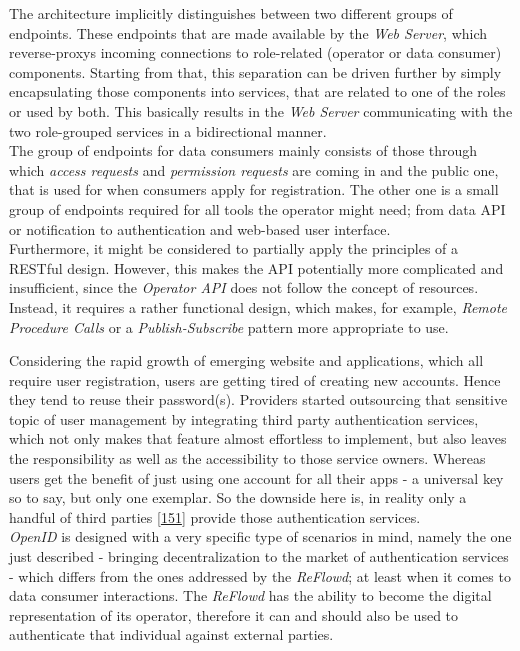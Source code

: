 \documentclass[12pt,english,a4paper,titlepage,cleardoublepage=empty,dottedtoc]{report}
\begin{document}
The architecture implicitly distinguishes between two different groups
of endpoints. These endpoints that are made available by the \emph{Web
Server}, which reverse-proxys incoming connections to role-related
(operator or data consumer) components. Starting from that, this
separation can be driven further by simply encapsulating those
components into services, that are related to one of the roles or used
by both. This basically results in the \emph{Web Server} communicating
with the two role-grouped services in a bidirectional manner.\\
The group of endpoints for data consumers mainly consists of those
through which \emph{access requests} and \emph{permission requests} are
coming in and the public one, that is used for when consumers apply for
registration. The other one is a small group of endpoints required for
all tools the operator might need; from data API or notification to
authentication and web-based user interface.\\
Furthermore, it might be considered to partially apply the principles of
a RESTful design. However, this makes the API potentially more
complicated and insufficient, since the \emph{Operator API} does not
follow the concept of resources. Instead, it requires a rather
functional design, which makes, for example, \emph{Remote Procedure
Calls} or a \emph{Publish-Subscribe} pattern more appropriate to use.

Considering the rapid growth of emerging website and applications, which
all require user registration, users are getting tired of creating new
accounts. Hence they tend to reuse their password(s). Providers started
outsourcing that sensitive topic of user management by integrating third
party authentication services, which not only makes that feature almost
effortless to implement, but also leaves the responsibility as well as
the accessibility to those service owners. Whereas users get the benefit
of just using one account for all their apps - a universal key so to
say, but only one exemplar. So the downside here is, in reality only a
handful of third parties
{[}\protect\hyperlink{ref-web_2009-success-of-facebook-connect}{151}{]}
provide those authentication services.\\
\emph{OpenID} is designed with a very specific type of scenarios in
mind, namely the one just described - bringing decentralization to the
market of authentication services - which differs from the ones
addressed by the \emph{ReFlowd}; at least when it comes to data consumer
interactions. The \emph{ReFlowd} has the ability to become the digital
representation of its operator, therefore it can and should also be used
to authenticate that individual against external parties.
\end{document}
